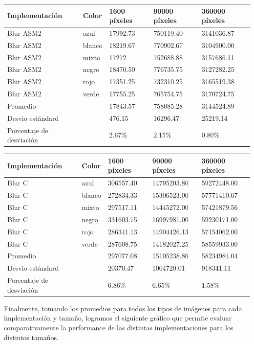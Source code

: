 \begin{tabular}{| l | l | l | l | l |}
\hline
Implementación & Color & 1600 píxeles & 90000 píxeles & 360000 píxeles\\
\hline
Blur ASM2 & azul & 17992.73 &  750119.40&  3141036.87\\ 
\hline
Blur ASM2 & blanco & 18219.67  & 770902.67 & 3104900.00\\ 
\hline
Blur ASM2 & mixto &  17272 & 752688.88 & 3157686.11\\ 
\hline
Blur ASM2 & negro & 18470.50  & 776735.75 & 3127282.25\\
\hline
Blur ASM2 & rojo & 17351.25 &  732310.25 & 3165519.38\\
\hline
Blur ASM2 & verde & 17755.25 & 765754.75 & 3170724.75\\ 
\hline
Promedio & &  17843.57  & 758085.28 & 3144524.89\\
\hline
Desvio estándard  && 476.15  & 16296.47  & 25219.14\\
\hline
Porcentaje de desviación  && 2.67\% & 2.15\% & 0.80\%\\
\hline
\end{tabular}

\begin{tabular}{| l | l | l | l | l |}
\hline
Implementación & Color & 1600 píxeles & 90000 píxeles & 360000 píxeles\\
\hline
Blur C & azul & 306557.40 & 14795203.80 & 59272448.00\\ 
\hline
Blur C & blanco & 272834.33 & 15306523.00 & 57771410.67\\ 
\hline
Blur C & mixto &  297517.11 & 14445272.00 & 57421879.56\\ 
\hline
Blur C & negro & 331603.75 & 16997981.00 & 59230171.00\\
\hline
Blur C & rojo & 286341.13 & 14904426.13 & 57154062.00\\
\hline
Blur C & verde & 287608.75 & 14182027.25 & 58559933.00\\ 
\hline
Promedio & &  297077.08 & 15105238.86 & 58234984.04\\
\hline
Desvio estándard  && 20370.47  & 1004720.01 & 918341.11\\
\hline
Porcentaje de desviación  && 6.86\% & 6.65\% & 1.58\%\\
\hline
\end{tabular}

Finalmente, tomando los promedios para todos los tipos de imágenes para cada implementación y tamaño, logramos el siguiente gráfico que permite evaluar comparativamente la performance de las distintas implementaciones para los distintos tamaños.

